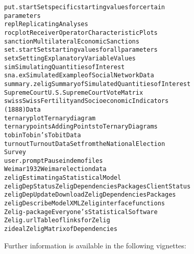 \begin{Details}
\begin{alltt}
put.start               Set specific starting values for certain
                        parameters
repl                    Replicating Analyses
rocplot                 Receiver Operator Characteristic Plots
sanction                Multilateral Economic Sanctions
set.start               Set starting values for all parameters
setx                    Setting Explanatory Variable Values
sim                     Simulating Quantities of Interest
sna.ex                  Simulated Example of Social Network Data
summary.zelig           Summary of Simulated Quantities of Interest
SupremeCourt            U.S. Supreme Court Vote Matrix
swiss                   Swiss Fertility and Socioeconomic Indicators
                        (1888) Data
ternaryplot             Ternary diagram
ternarypoints           Adding Points to Ternary Diagrams
tobin                   Tobin's Tobit Data
turnout                 Turnout Data Set from the National Election
                        Survey
user.prompt             Pause in demo files
Weimar                  1932 Weimar election data
zelig                   Estimating a Statistical Model
zeligDepStatus          Zelig Dependencies Packages Client Status
zeligDepUpdate          Download Zelig Dependencies Packages
zeligDescribeModelXML   Zelig interface functions
Zelig-package           Everyone's Statistical Software
Zelig.url               Table of links for Zelig
zideal                  Zelig Matrix of Dependencies
\end{alltt}

Further information is available in the following vignettes:


\end{Details}
